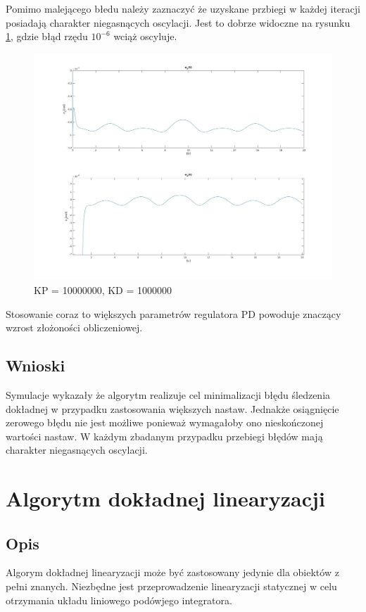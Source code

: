 \documentclass[12pt,a4paper]{article}
\begin{document}
    Pomimo malejącego błedu należy zaznaczyć że uzyskane przbiegi w każdej iteracji posiadają charakter niegasnących oscylacji. Jest to dobrze widoczne na rysunku \ref{fig:10000000}, gdzie błąd rzędu $10^{-6}$ wciąż oscyluje.

  \begin{figure}[H]
    \centering
    \includegraphics[height=0.45\textheight]{figures/qui10000000_2.jpg}
    \caption{KP = 10000000, KD = 1000000}
    \label{fig:10000000}
  \end{figure}

    Stosowanie coraz to większych parametrów regulatora PD powoduje znaczący wzrost złożoności obliczeniowej.

  \subsection{Wnioski}
    Symulacje wykazały że algorytm realizuje cel minimalizacji błędu śledzenia dokładnej w przypadku zastosowania większych nastaw. Jednakże osiągnięcie zerowego błędu nie jest możliwe ponieważ wymagałoby ono nieskończonej wartości nastaw. W każdym zbadanym przypadku przebiegi błędów mają charakter niegasnących oscylacji.


\section{Algorytm dokładnej linearyzacji}
  \subsection{Opis} %
    Algorym dokładnej linearyzacji może być zastosowany jedynie dla obiektów z pełni znanych. Niezbędne jest przeprowadzenie linearyzacji statycznej w celu otrzymania układu liniowego podówjego integratora.
\end{document}
